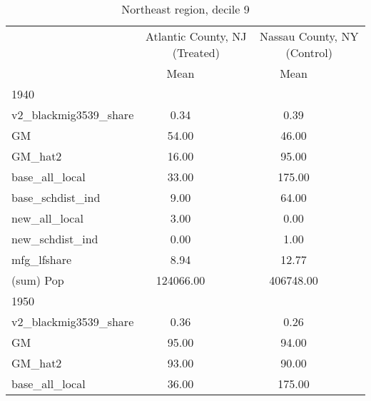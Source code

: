 \begin{table}[htbp]\centering
\def\sym#1{\ifmmode^{#1}\else\(^{#1}\)\fi}
\caption{Northeast region, decile 9 \label{tab1}}
\begin{tabular}{l*{2}{ccc}}
\toprule
                    &\multicolumn{3}{c}{Atlantic County, NJ (Treated)}&\multicolumn{3}{c}{Nassau County, NY (Control)}\\
                    &        Mean&            &            &        Mean&            &            \\
\midrule
1940                &            &            &            &            &            &            \\
v2\_blackmig3539\_share&        0.34&            &            &        0.39&            &            \\
GM                  &       54.00&            &            &       46.00&            &            \\
GM\_hat2             &       16.00&            &            &       95.00&            &            \\
base\_all\_local      &       33.00&            &            &      175.00&            &            \\
base\_schdist\_ind    &        9.00&            &            &       64.00&            &            \\
new\_all\_local       &        3.00&            &            &        0.00&            &            \\
new\_schdist\_ind     &        0.00&            &            &        1.00&            &            \\
mfg\_lfshare         &        8.94&            &            &       12.77&            &            \\
(sum) Pop           &   124066.00&            &            &   406748.00&            &            \\
\midrule
1950                &            &            &            &            &            &            \\
v2\_blackmig3539\_share&        0.36&            &            &        0.26&            &            \\
GM                  &       95.00&            &            &       94.00&            &            \\
GM\_hat2             &       93.00&            &            &       90.00&            &            \\
base\_all\_local      &       36.00&            &            &      175.00&            &            \\

\end{tabular}
\end{table}
